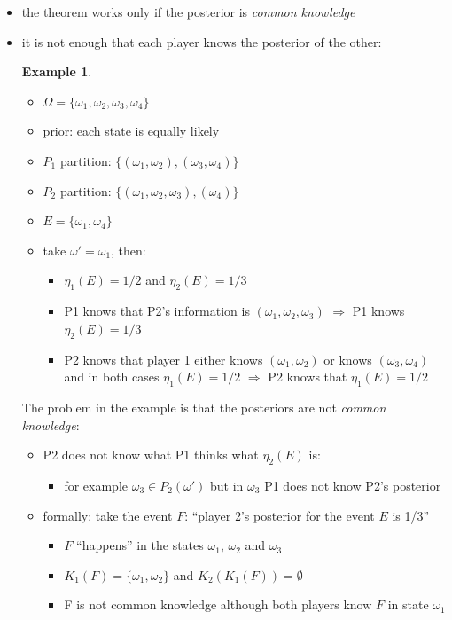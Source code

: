 \documentclass{beamer}    %
\newcommand{\Ra}{\Rightarrow}
\theoremstyle{plain}
\theoremstyle{definition}
\newtheorem{ex}{Example}
\begin{document}
{\begin{itemize}
\item the theorem works only if the posterior is  \emph{common knowledge}
\item it is not enough that each player knows the posterior of the other:
  \begin{ex}
    \begin{itemize}
    \item $\Omega=\{\omega_1,\omega_2,\omega_3,\omega_4\}$
    \item prior: each state is equally likely
    \item $P_1$ partition: $\{(\omega_1,\omega_2),(\omega_3,\omega_4)\}$
   \item $P_2$ partition:  $\{(\omega_1,\omega_2,\omega_3),(\omega_4)\}$
   \item   $E=\{\omega_1,\omega_4\}$
   \item take $\omega'=\omega_1$, then:
     \begin{itemize}
     \item $\eta_1(E)=1/2$ and $\eta_2(E)=1/3$
     \item P1 knows that P2's information is  $(\omega_1,\omega_2,\omega_3)$ $\Ra$ P1 knows  $\eta_2(E)=1/3$
    \item P2 knows that player 1 either knows
       $(\omega_1,\omega_2)$ or knows $(\omega_3,\omega_4)$ and in
       both cases $\eta_1(E)=1/2$ $\Ra$ P2 knows that $\eta_1(E)=1/2$
     \end{itemize}
    \end{itemize}
  \end{ex}

\framebreak

  The problem in the example is that the posteriors are not \emph{common knowledge}:
  \begin{itemize}
  \item P2 does not know what P1 thinks what $\eta_2(E)$ is:
    \begin{itemize}
    \item for example $\omega_3\in P_2(\omega')$ but in $\omega_3$ P1 does not know P2's posterior%
    \end{itemize}

    \item formally: take the event $F$: ``player 2's posterior for the event $E$ is 1/3''
      \begin{itemize}
      \item $F$ ``happens'' in the states $\omega_1$, $\omega_2$ and $\omega_3$
      \item $K_1(F)=\{\omega_1,\omega_2\}$ and
        $K_2(K_1(F))=\emptyset$
      \item F is not common knowledge  although both players know $F$ in state $\omega_1$
      \end{itemize}
  \end{itemize}
\end{itemize}
}
\end{document}
